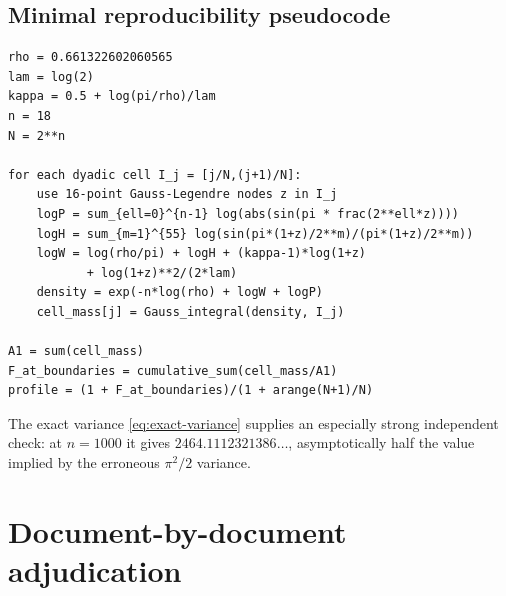 \documentclass[11pt,oneside]{article}
\theoremstyle{definition}
\theoremstyle{remark}
\begin{document}
\subsection{Minimal reproducibility pseudocode}

\begin{lstlisting}[style=code,caption={Direct dyadic-cell quadrature for the natural profile}]
rho = 0.661322602060565
lam = log(2)
kappa = 0.5 + log(pi/rho)/lam
n = 18
N = 2**n

for each dyadic cell I_j = [j/N,(j+1)/N]:
    use 16-point Gauss-Legendre nodes z in I_j
    logP = sum_{ell=0}^{n-1} log(abs(sin(pi * frac(2**ell*z))))
    logH = sum_{m=1}^{55} log(sin(pi*(1+z)/2**m)/(pi*(1+z)/2**m))
    logW = log(rho/pi) + logH + (kappa-1)*log(1+z)
           + log(1+z)**2/(2*lam)
    density = exp(-n*log(rho) + logW + logP)
    cell_mass[j] = Gauss_integral(density, I_j)

A1 = sum(cell_mass)
F_at_boundaries = cumulative_sum(cell_mass/A1)
profile = (1 + F_at_boundaries)/(1 + arange(N+1)/N)
\end{lstlisting}

The exact variance \eqref{eq:exact-variance} supplies an especially strong
independent check: at \(n=1000\) it gives
\(2464.1112321386\ldots\), asymptotically half the value implied by the
erroneous \(\pi^2/2\) variance.

\section{Document-by-document adjudication}
\label{sec:audit}
\end{document}
